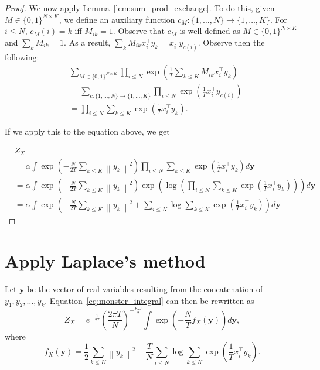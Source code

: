\begin{proof}
We now apply Lemma~\ref{lem:sum_prod_exchange}. To do this, given $M \in \{0, 1\}^{N \times K}$, we define an auxiliary function $c_M : \{1, \ldots, N\} \to \{1, \ldots, K\}$. For $i \leq N$, $c_M(i) = k$ iff $M_{ik} = 1$. Observe that $c_M$ is well defined as $M \in \{0, 1\}^{N \times K}$ and $\sum_k M_{ik} = 1$. As a result, $\sum_k {M_{ik}}x_i^\top y_k = x_i^\top y_{c(i)}$. Observe then the following:
%
\begin{align}
&\sum_{M \in \{0, 1\}^{N \times K}}\prod_{i \leq N}\exp\left(\frac{1}{T}\sum_{k \leq K}M_{ik}x_i^\top y_k\right) \\
&= \sum_{c : \{1, \ldots, N\} \to \{1, \ldots, K\}}\prod_{i \leq N}\exp\left(\frac{1}{T}x_i^\top y_{c(i)}\right)\\
&= \prod_{i \leq N}\sum_{k \leq K}\exp\left(\frac{1}{T}x_i^\top y_k\right).
\end{align}
% 

If we apply this to the equation above, we get

\begin{align}
&Z_X\\
 &= \alpha\int \exp\left(- \frac{N}{2T}\sum_{k \leq K}\left\|y_k\right\|^2\right)\prod_{i \leq N}\sum_{k \leq K}\exp\left(\frac{1}{T}x_i^\top y_k\right)d\mathbf{y}\\
&= \alpha\int \exp\left(- \frac{N}{2T}\sum_{k \leq K}\left\|y_k\right\|^2\right)\exp\left(\log\left(\prod_{i \leq N}\sum_{k \leq K}\exp\left(\frac{1}{T}x_i^\top y_k\right)\right)\right)d\mathbf{y}\\
&= \alpha\int \exp\left(- \frac{N}{2T}\sum_{k \leq K}\left\|y_k\right\|^2 + \sum_{i \leq N}\log\sum_{k \leq K}\exp\left(\frac{1}{T}x_i^\top y_k\right)\right)d\mathbf{y}\label{eq:monster_integral}
\end{align}
\end{proof}

\section{Apply Laplace's method}


Let $\mathbf{y}$ be the vector of real variables resulting from the concatenation of $y_1, y_2, \ldots, y_k$. Equation~\ref{eq:monster_integral} can then be rewritten as
%
\begin{equation}
Z_X = e^{-\frac{1}{2T}}\left(\frac{2\pi T}{N}\right)^{-\frac{KD}{2}}\int \exp\left( - \frac{N}{T}f_X(\mathbf{y}) \right)d\mathbf{y},
\end{equation}
%
where
%
\begin{equation}
f_X(\mathbf{y}) = \frac{1}{2}\sum_{k \leq K}\left\|y_k\right\|^2 - \frac{T}{N}\sum_{i \leq N}\log\sum_{k \leq K}\exp\left(\frac{1}{T}x_i^\top y_k\right).
\end{equation}

